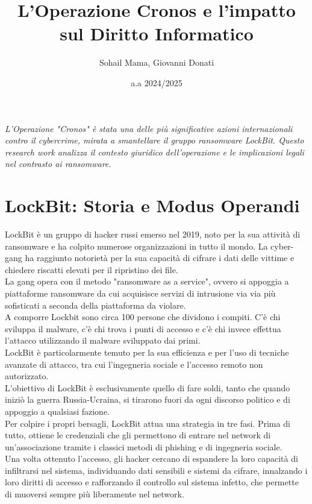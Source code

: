 \documentclass[a4paper,12pt,twoside]{article}
\title{\textbf{L'Operazione Cronos e l'impatto sul Diritto Informatico}}
\author{Sohail Mama, Giovanni Donati}
\date{a.a 2024/2025}
\begin{document}
\maketitle

\vfill
\begin{center}
\textit{L'Operazione "Cronos" è stata una delle più significative azioni internazionali contro il cybercrime, mirata a smantellare il gruppo ransomware LockBit. Questo research work analizza il contesto giuridico dell'operazione e le implicazioni legali nel contrasto ai ransomware.}
\end{center}
\vspace{3cm}


\newpage
\tableofcontents
\newpage

\section{LockBit: Storia e Modus Operandi}
LockBit è un gruppo di hacker russi emerso nel 2019, noto per la sua attività di ransomware e ha colpito numerose organizzazioni in tutto il mondo. La cyber-gang ha raggiunto notorietà per la sua capacità di cifrare i dati delle vittime e chiedere riscatti elevati per il ripristino dei file. \\
La gang opera con il metodo "ransomware as a service", ovvero si appoggia a piattaforme ransomware da cui acquisisce servizi di intrusione via via più sofisticati a seconda della piattaforma da violare.\\
A comporre Lockbit sono circa 100 persone che dividono i compiti. C'è chi sviluppa il malware, c'è chi trova i punti di accesso e c'è chi invece effettua l'attacco utilizzando il malware sviluppato dai primi.\\
LockBit è particolarmente temuto per la sua efficienza e per l'uso di tecniche avanzate di attacco, tra cui l'ingegneria sociale e l'accesso remoto non autorizzato.\\
L'obiettivo di LockBit è esclusivamente quello di fare soldi, tanto che quando iniziò la guerra Russia-Ucraina, si tirarono fuori da ogni discorso politico e di appoggio a qualsiasi fazione.\\
Per colpire i propri bersagli, LockBit attua una strategia in tre fasi. Prima di tutto, ottiene le credenziali che gli permettono di entrare nel network di un'associazione tramite i classici metodi di phishing e di ingegneria sociale.\\
Una volta ottenuto l'accesso, gli hacker cercano di espandere la loro capacità di infiltrarsi nel sistema, individuando dati sensibili e sistemi da cifrare, innalzando i loro diritti di accesso e rafforzando il controllo sul sistema infetto, che permette di muoversi sempre più liberamente nel network. \\
\end{document}
